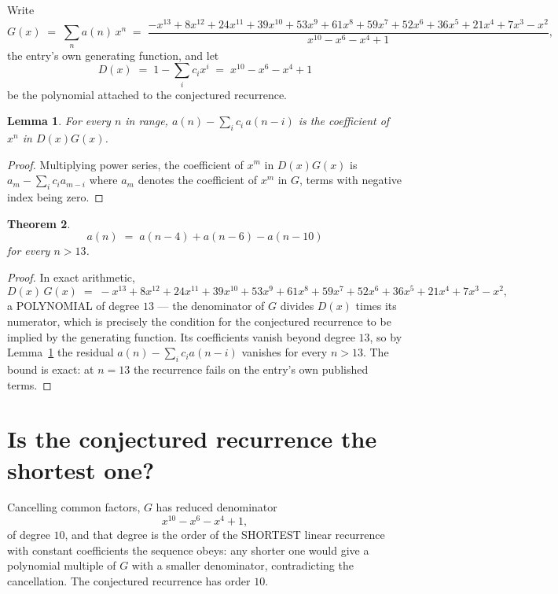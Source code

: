 \documentclass[11pt,a4paper]{article}
\theoremstyle{plain}
\newtheorem{theorem}{Theorem}
\newtheorem{lemma}[theorem]{Lemma}
\theoremstyle{definition}
\begin{document}
Write
\[
G(x)\;=\;\sum_{n}a(n)\,x^{n}\;=\;\frac{- x^{13} + 8 x^{12} + 24 x^{11} + 39 x^{10} + 53 x^{9} + 61 x^{8} + 59 x^{7} + 52 x^{6} + 36 x^{5} + 21 x^{4} + 7 x^{3} - x^{2}}{x^{10} - x^{6} - x^{4} + 1},
\]
the entry's own generating function, and let
\[
D(x)\;=\;1-\sum_i c_i x^{i}\;=\;x^{10} - x^{6} - x^{4} + 1
\]
be the polynomial attached to the conjectured recurrence.

\begin{lemma}\label{lem:key}
For every $n$ in range, $a(n)-\sum_i c_i\,a(n-i)$ is the coefficient of $x^{n}$ in
$D(x)G(x)$.
\end{lemma}

\begin{proof}
Multiplying power series, the coefficient of $x^{m}$ in $D(x)G(x)$ is
$a_m-\sum_i c_i a_{m-i}$ where $a_m$ denotes the coefficient of $x^{m}$ in $G$, terms with
negative index being zero.
\end{proof}

\begin{theorem}
\[
a(n)\;=\;a(n-4) + a(n-6) - a(n-10)
\]
for every $n>13$.
\end{theorem}

\begin{proof}
In exact arithmetic,
\[
D(x)\,G(x)\;=\;- x^{13} + 8 x^{12} + 24 x^{11} + 39 x^{10} + 53 x^{9} + 61 x^{8} + 59 x^{7} + 52 x^{6} + 36 x^{5} + 21 x^{4} + 7 x^{3} - x^{2},
\]
a POLYNOMIAL of degree $13$ --- the denominator of $G$ divides $D(x)$ times its numerator,
which is precisely the condition for the conjectured recurrence to be implied by the
generating function. Its coefficients vanish beyond degree $13$, so by
Lemma~\ref{lem:key} the residual $a(n)-\sum_ic_ia(n-i)$ vanishes for every
$n>13$. The bound is exact: at $n=13$ the recurrence fails on the entry's own published terms.
\end{proof}

\section{Is the conjectured recurrence the shortest one?}

Cancelling common factors, $G$ has reduced denominator
\[
x^{10} - x^{6} - x^{4} + 1,
\]
of degree $10$, and that degree is the order of the SHORTEST linear recurrence with
constant coefficients the sequence obeys: any shorter one would give a polynomial multiple of
$G$ with a smaller denominator, contradicting the cancellation. The conjectured recurrence has
order $10$.
\end{document}
